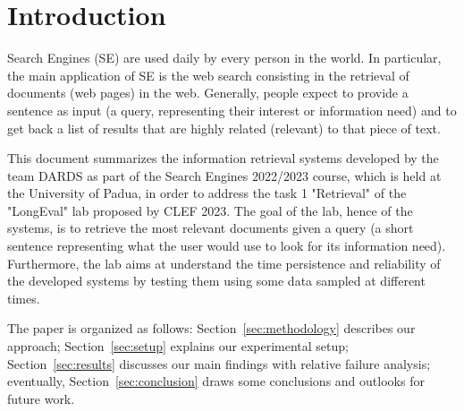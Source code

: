 \section{Introduction}
\label{sec:introduction}
%
%

Search Engines (SE) are used daily by every person in the world. In particular, the main application of SE is the web search consisting in the retrieval of documents (web pages) in the web. Generally, people expect to provide a sentence as input (a query, representing their interest or information need) and to get back a list of results that are highly related (relevant) to that piece of text.
\par
This document summarizes the information retrieval systems developed by the team DARDS as part of the Search Engines 2022/2023 course, which is held at the University of Padua, in order to address the task 1 "Retrieval" of the "LongEval" lab proposed by CLEF 2023. The goal of the lab, hence of the systems, is to retrieve the most relevant documents given a query (a short sentence representing what the user would use to look for its information need). Furthermore, the lab aims at understand the time persistence and reliability of the developed systems by testing them using some data sampled at different times.

\par
The paper is organized as follows: Section~\ref{sec:methodology} describes our approach; Section~\ref{sec:setup} explains our experimental setup; Section~\ref{sec:results} discusses our main findings with relative failure analysis; eventually, Section~\ref{sec:conclusion} draws some conclusions and outlooks for future work.